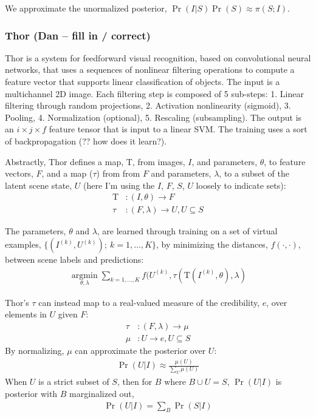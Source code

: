 \documentclass[]{report}
\begin{document}
We approximate the unormalized posterior, $\Pr(I | S)\Pr(S) \approx
\pi(S; I)$. 

\subsubsection*{Thor (Dan -- fill in / correct)}
Thor is a system for feedforward visual recognition, based on
convolutional neural networks, that uses a sequences of nonlinear
filtering operations to compute a feature vector that supports linear
classification of objects. The input is a multichannel 2D image. Each
filtering step is composed of 5 sub-steps: 1. Linear filtering through
random projections, 2. Activation nonlinearity (sigmoid), 3. Pooling,
4. Normalization (optional), 5. Rescaling (subsampling). The output is
an $i\times j\times f$ feature tensor that is input to a linear
SVM. The training uses a sort of backpropagation (?? how does it
learn?).

Abstractly, Thor defines a map, $\mathrm{T}$, from images, $I$, and
parameters, $\theta$, to feature vectors, $F$, and a map ($\tau$) from
from $F$ and parameters, $\lambda$, to a subset of the latent scene
state, $U$ (here I'm using the $I$, $F$, $S$, $U$ loosely to indicate
sets):
\begin{align*}
  \mathrm{T} &: (I, \theta) \rightarrow F\\
  \tau &: (F, \lambda) \rightarrow U, U \subseteq S
\end{align*}

The parameters, $\theta$ and $\lambda$, are learned through training
on a set of virtual examples, $\{(I^{(k)}, U^{(k)});\ k=1, \dots,
K\}$, by minimizing the distances, $f(\cdot,\cdot)$, between scene
labels and predictions:
\begin{align*}
  \underset{\theta, \lambda}{\operatorname{argmin}} \sum_{k=1, \dots, K}
  f(U^{(k)}, \tau(\mathrm{T}(I^{(k)}, \theta), \lambda)
\end{align*}

Thor's $\tau$ can instead map to a real-valued measure of the
credibility, $e$, over elements in $U$ given $F$:
\begin{align*}
  \tau &: (F, \lambda) \rightarrow \mu\\
  \mu &: U \rightarrow e, U \subseteq S
\end{align*}
By normalizing, $\mu$ can approximate the posterior over $U$:
\begin{align*}
  \Pr(U|I) \approx \frac{\mu(U)}{\sum_U \mu(U)}
\end{align*}
When $U$ is a strict subset of $S$, then for $B$ where $B \cup U = S$,
$\Pr(U|I)$ is posterior with $B$ marginalized out,
\begin{align*}
  \Pr(U|I) = \sum_B \Pr(S|I)
\end{align*}
\end{document}
